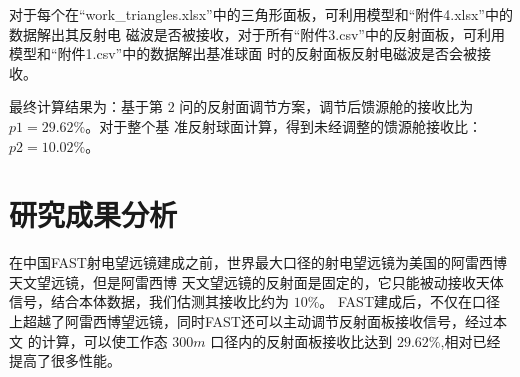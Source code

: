 \documentclass[withoutpreface,bwprint]{cumcmthesis} %
\begin{document}
对于每个在“work\_triangles.xlsx”中的三角形面板，可利用模型和“附件4.xlsx”中的数据解出其反射电
磁波是否被接收，对于所有“附件3.csv”中的反射面板，可利用模型和“附件1.csv”中的数据解出基准球面
时的反射面板反射电磁波是否会被接收。

最终计算结果为：基于第 $2$ 问的反射面调节方案，调节后馈源舱的接收比为 $p1 = 29.62\%$。对于整个基
准反射球面计算，得到未经调整的馈源舱接收比：$p2 = 10.02\%$。
\section{研究成果分析}
在中国FAST射电望远镜建成之前，世界最大口径的射电望远镜为美国的阿雷西博天文望远镜，但是阿雷西博
天文望远镜的反射面是固定的，它只能被动接收天体信号，结合本体数据，我们估测其接收比约为 $10\%$。
FAST建成后，不仅在口径上超越了阿雷西博望远镜，同时FAST还可以主动调节反射面板接收信号，经过本文
的计算，可以使工作态 $300m$ 口径内的反射面板接收比达到 $29.62\%$,相对已经提高了很多性能。
\end{document}
